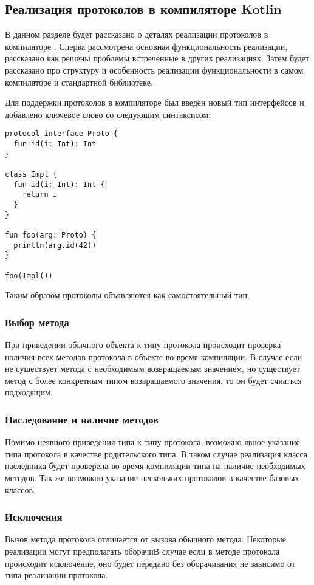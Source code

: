 \subsection{Реализация протоколов в компиляторе Kotlin}
В данном разделе будет рассказано о деталях реализации протоколов в компиляторе . Сперва рассмотрена основная функциональность реализации, рассказано как решены проблемы встреченные в других реализациях. Затем будет рассказано про структуру и особенность реализации функциональности в самом компиляторе и стандартной библиотеке.

Для поддержки протоколов в компиляторе был введён новый тип интерфейсов и добавлено ключевое слово  со следующим синтаксисом:

\begin{verbatim}
protocol interface Proto {
  fun id(i: Int): Int
}

class Impl {
  fun id(i: Int): Int {
    return i
  }
}

fun foo(arg: Proto) {
  println(arg.id(42))
}

foo(Impl())
\end{verbatim}

Таким образом протоколы объявляются как самостоятельный тип.

\subsubsection{Выбор метода}
При приведении обычного объекта к типу протокола происходит проверка наличия всех методов протокола в объекте во время компиляции. В случае если не существует метода с необходимым возвращаемым значением, но существует метод с более конкретным типом возвращаемого значения, то он будет счиаться подходящим.

\subsubsection{Наследование и наличие методов}
Помимо неявного приведения типа к типу протокола, возможно явное указание типа протокола в качестве родительского типа. В таком случае реализация класса наследника будет проверена во время компиляции типа на наличие необходимых методов. Так же возможно указание нескольких протоколов в качестве базовых классов.

\subsubsection{Исключения}
Вызов метода протокола отличается от вызова обычного метода. Некоторые реализации могут предполагать оборачиВ случае если в методе протокола происходит исключение, оно будет передано без оборачивания не зависимо от типа реализации протокола.

